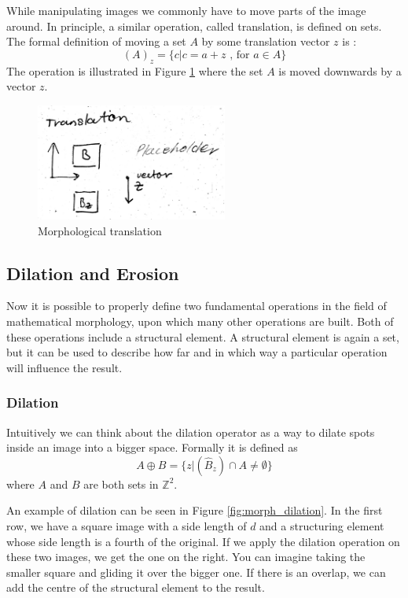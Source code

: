 \documentclass[
  digital,     %
  oneside,     %
  nosansbold,  %
  nocolorbold, %
  lof,         %
  lot,         %
]{fithesis4}
\newcommand*{\Z}{\ensuremath{\mathbb{Z}}}
\begin{document}
While manipulating images we commonly have to move parts of the image around.
In principle, a similar operation, called translation, is defined on sets. The
formal definition of moving a set $A$ by some translation vector $z$ is
\cite{gonzalez2002}:
$$(A)_z = \{c | c = a + z\text{ , for } a \in A\}$$
The operation is illustrated in Figure \ref{fig:morph_translation} where the set
$A$ is moved downwards by a vector $z$.
\begin{figure}
    \begin{center}
        \includegraphics[width=6.3cm]{resources/morph_translation.jpg}
    \end{center}
    \caption{Morphological translation} %
    \label{fig:morph_translation}
\end{figure}

\subsection{Dilation and Erosion}
Now it is possible to properly define two fundamental operations in the field of
mathematical morphology, upon which many other operations are built. Both of
these operations include a structural element. A structural element is again a
set, but it can be used to describe how far and in which way a particular
operation will influence the result.


\subsubsection{Dilation}
Intuitively we can think about the dilation operator as a way to dilate spots
inside an image into a bigger space. Formally it is defined as
\cite{gonzalez2002}
$$A \oplus B = \{z | (\hat{B}_z) \cap A \neq \emptyset\}$$
where $A$ and $B$ are both sets in $\Z^2$.

An example of dilation can be seen in Figure \ref{fig:morph_dilation}. In the
first row, we have a square image with a side length of $d$ and a structuring
element whose side length is a fourth of the original. If we apply the dilation
operation on these two images, we get the one on the right. You can imagine
taking the smaller square and gliding it over the bigger one. If there is an
overlap, we can add the centre of the structural element to the result.
\end{document}

